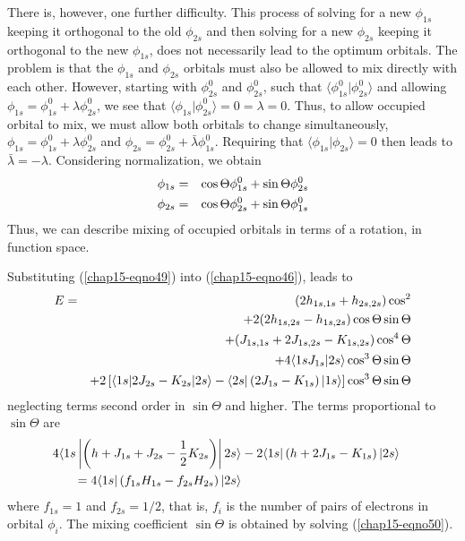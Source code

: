 There is, however, one further difficulty. This process of solving for
a new $\phi_{1s}$  keeping it orthogonal to the old $\phi_{2s}$ and 
then solving for a new $\phi_{2s}$ keeping it orthogonal to the new 
$\phi_{1s}$, does not necessarily lead to the optimum orbitals. The 
problem is that the $\phi_{1s}$ and $\phi_{2s}$ orbitals must also
be allowed to mix directly with each other. However, starting with 
$\phi_{2s}^0$ and $\phi_{2s}^0$, such that $\langle \phi_{1s}^0 | 
\phi_{2s}^0 \rangle$ and allowing $\phi_{1s} = \phi_{1s}^0 + \lambda 
\phi^0_{2s}$, we see that $\langle \phi_{1s} | \phi^0_{2s} \rangle = 
0 = \lambda = 0$.  Thus, to allow occupied orbital to mix, we must 
allow both orbitals to change simultaneously, $\phi_{1s} = 
\phi^0_{1s} + \lambda \phi^0_{2s}$ and $\phi_{2s} = \phi^0_{2s} + 
{\bar{\lambda}} \phi^0_{1s}$.  Requiring that $\langle \phi_{1s} | 
\phi_{2s} \rangle = 0$ then leads to ${\bar{\lambda}} = - 
\lambda$.  Considering normalization, we obtain
\begin{eqnarray}
\phi_{1s} &=& \cos \Theta \phi^0_{1s} + \sin \Theta \phi^0_{2s}\cr
\phi_{2s} &=& \cos \Theta \phi^0_{2s} + \sin \Theta 
\phi^0_{1s}
\label{chap15-eqno49}
\end{eqnarray}
Thus, we can describe mixing of occupied orbitals in terms of a rotation, in
function space.

Substituting (\ref{chap15-eqno49}) into (\ref{chap15-eqno46}), leads to
\begin{eqnarray}
E &= & (2h_{1s,1s} + h_{2s,2s}) \cos^2\cr
&& + 2 (2h_{1s,2s} - h_{1s,2s}) \cos \Theta \sin \Theta\cr
&& + (J_{1s,1s} + 2J_{1s,2s} - K_{1s,2s}) \cos^4 \Theta\cr
&& + 4 \langle 1s J_{1s} | 2s \rangle \cos^3 \Theta \sin \Theta\cr
&& + 2 \left[ \langle 1s | 2 J_{2s} - K_{2s} | 2s \rangle - \langle 2s | 
\left( 2J_{1s} - K_{1s} \right) | 1s \rangle \right] \cos^3 \Theta \sin 
\Theta
\label{chap15-eqno50}
\end{eqnarray}
neglecting terms second order in $\sin \Theta$ and higher. The terms 
proportional to $\sin \Theta$ are
\begin{eqnarray}
4 \langle 1s \left| \left( h + J_{1s} + J_{2s} - {1 \over 2} K_{2s} 
\right) \right| 2s \rangle & - 2 \langle 1s | \left( h + 2 J_{1s} - 
K_{1s} \right) | 2s \rangle\cr
= 4 \langle 1s | \left( f_{1s} H_{1s} - f_{2s} H_{2s} \right) | 2s 
\rangle
\label{chap15-eqno51}
\end{eqnarray}
where $f_{1s} = 1$ and $f_{2s} = 1/2$, that is, $f_i$ is the number of
pairs of electrons in orbital $\phi_i$. The mixing coefficient $\sin
\Theta$ is obtained by solving (\ref{chap15-eqno50}).

